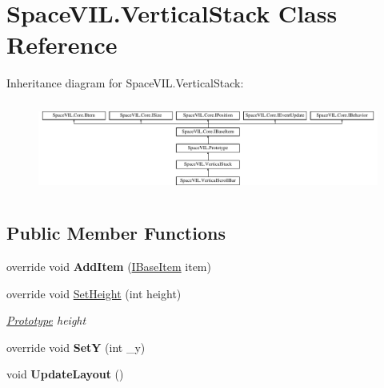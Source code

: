\hypertarget{class_space_v_i_l_1_1_vertical_stack}{}\section{Space\+V\+I\+L.\+Vertical\+Stack Class Reference}
\label{class_space_v_i_l_1_1_vertical_stack}
Inheritance diagram for Space\+V\+I\+L.\+Vertical\+Stack\+:\begin{figure}[H]
\begin{center}
\leavevmode
\includegraphics[height=3.027027cm]{class_space_v_i_l_1_1_vertical_stack}
\end{center}
\end{figure}
\subsection*{Public Member Functions}
\begin{DoxyCompactItemize}
\item 
\mbox{\label{class_space_v_i_l_1_1_vertical_stack_ada632b0ed9e6e9518c8f0054eb0be1ce}} 
override void {\bfseries Add\+Item} (\mbox{\hyperlink{interface_space_v_i_l_1_1_core_1_1_i_base_item}{I\+Base\+Item}} item)
\item 
override void \mbox{\hyperlink{class_space_v_i_l_1_1_vertical_stack_a1e2360b005a6fb8e503dc60d27f1f021}{Set\+Height}} (int height)
\begin{DoxyCompactList}\small\item\em \mbox{\hyperlink{class_space_v_i_l_1_1_prototype}{Prototype}} height \end{DoxyCompactList}\item 
\mbox{\label{class_space_v_i_l_1_1_vertical_stack_a01db47bbec9d8b0629b0c40c51a81710}} 
override void {\bfseries SetY} (int \+\_\+y)
\item 
\mbox{\label{class_space_v_i_l_1_1_vertical_stack_a5d72bb6cbbe27b498e62bc1c9ff02c2c}} 
void {\bfseries Update\+Layout} ()
\end{DoxyCompactItemize}
